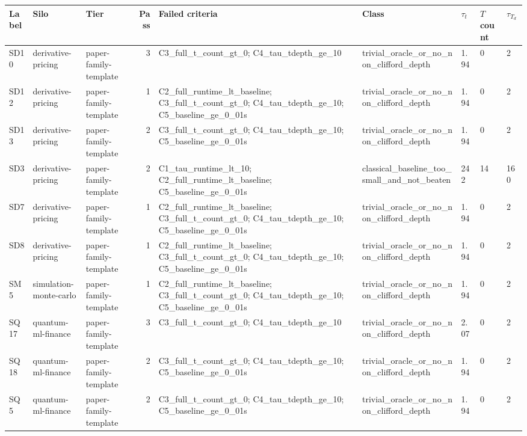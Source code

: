 \begin{tabular}{lllrlllll}
\toprule
Label & Silo & Tier & Pass & Failed criteria & Class & $\tau_t$ & $T$ count & $\tau_{T_d}$ \\
\midrule
SD10 & derivative-pricing & paper-family-template & 3 & C3\_full\_t\_count\_gt\_0; C4\_tau\_tdepth\_ge\_10 & trivial\_oracle\_or\_no\_non\_clifford\_depth & 1.94 & 0 & 2 \\
SD12 & derivative-pricing & paper-family-template & 1 & C2\_full\_runtime\_lt\_baseline; C3\_full\_t\_count\_gt\_0; C4\_tau\_tdepth\_ge\_10; C5\_baseline\_ge\_0\_01s & trivial\_oracle\_or\_no\_non\_clifford\_depth & 1.94 & 0 & 2 \\
SD13 & derivative-pricing & paper-family-template & 2 & C3\_full\_t\_count\_gt\_0; C4\_tau\_tdepth\_ge\_10; C5\_baseline\_ge\_0\_01s & trivial\_oracle\_or\_no\_non\_clifford\_depth & 1.94 & 0 & 2 \\
SD3 & derivative-pricing & paper-family-template & 2 & C1\_tau\_runtime\_lt\_10; C2\_full\_runtime\_lt\_baseline; C5\_baseline\_ge\_0\_01s & classical\_baseline\_too\_small\_and\_not\_beaten & 242 & 14 & 160 \\
SD7 & derivative-pricing & paper-family-template & 1 & C2\_full\_runtime\_lt\_baseline; C3\_full\_t\_count\_gt\_0; C4\_tau\_tdepth\_ge\_10; C5\_baseline\_ge\_0\_01s & trivial\_oracle\_or\_no\_non\_clifford\_depth & 1.94 & 0 & 2 \\
SD8 & derivative-pricing & paper-family-template & 1 & C2\_full\_runtime\_lt\_baseline; C3\_full\_t\_count\_gt\_0; C4\_tau\_tdepth\_ge\_10; C5\_baseline\_ge\_0\_01s & trivial\_oracle\_or\_no\_non\_clifford\_depth & 1.94 & 0 & 2 \\
SM5 & simulation-monte-carlo & paper-family-template & 1 & C2\_full\_runtime\_lt\_baseline; C3\_full\_t\_count\_gt\_0; C4\_tau\_tdepth\_ge\_10; C5\_baseline\_ge\_0\_01s & trivial\_oracle\_or\_no\_non\_clifford\_depth & 1.94 & 0 & 2 \\
SQ17 & quantum-ml-finance & paper-family-template & 3 & C3\_full\_t\_count\_gt\_0; C4\_tau\_tdepth\_ge\_10 & trivial\_oracle\_or\_no\_non\_clifford\_depth & 2.07 & 0 & 2 \\
SQ18 & quantum-ml-finance & paper-family-template & 2 & C3\_full\_t\_count\_gt\_0; C4\_tau\_tdepth\_ge\_10; C5\_baseline\_ge\_0\_01s & trivial\_oracle\_or\_no\_non\_clifford\_depth & 1.94 & 0 & 2 \\
SQ5 & quantum-ml-finance & paper-family-template & 2 & C3\_full\_t\_count\_gt\_0; C4\_tau\_tdepth\_ge\_10; C5\_baseline\_ge\_0\_01s & trivial\_oracle\_or\_no\_non\_clifford\_depth & 1.94 & 0 & 2 \\

\end{tabular}
